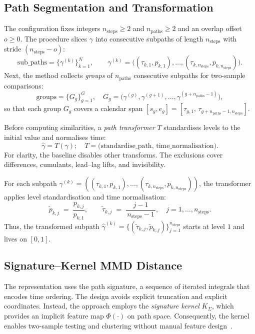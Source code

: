 \subsection{Path Segmentation and Transformation}\label{sec:regime:seg}
The configuration fixes integers $n_{\text{steps}}\ge 2$ and $n_{\text{paths}}\ge 2$ and an overlap offset $o\ge 0$. The procedure slices $\gamma$ into consecutive subpaths of length $n_{\text{steps}}$ with stride $(n_{\text{steps}}-o)$:
\[
\textstyle
\mathrm{sub\_paths}
=\big\{\gamma^{(k)}\big\}_{k=1}^{N},\qquad
\gamma^{(k)}=\big((\tau_{k,1},p_{k,1}),\ldots,(\tau_{k,n_{\text{steps}}},p_{k,n_{\text{steps}}})\big).
\]
Next, the method collects \emph{groups} of $n_{\text{paths}}$ consecutive subpaths for two-sample comparisons:
\[
\textstyle
\mathrm{groups}=\big\{G_g\big\}_{g=1}^{G},\quad
G_g=\big(\gamma^{(g)},\gamma^{(g+1)},\ldots,\gamma^{(g+n_{\text{paths}}-1)}\big),
\]
so that each group $G_g$ covers a calendar span
$[s_g,e_g]=[\tau_{g,1},\,\tau_{g+n_{\text{paths}}-1,n_{\text{steps}}}]$.

Before computing similarities, a \emph{path transformer} \(T\) standardises levels to the initial value and normalises time:
\[
\widehat\gamma=T(\gamma);\quad
T=\text{(standardise\_path, time\_normalisation)}.
\]
For clarity, the baseline disables other transforms. The exclusions cover differences, cumulants, lead--lag lifts, and invisibility.

For each subpath $\gamma^{(k)}=((\tau_{k,1},p_{k,1}),\dots,(\tau_{k,n_{\text{steps}}},p_{k,n_{\text{steps}}}))$, the transformer applies level standardisation and time normalisation:
\[
\tilde p_{k,j}\;=\;\frac{p_{k,j}}{p_{k,1}},\qquad
\tilde \tau_{k,j}\;=\;\frac{j-1}{\,n_{\text{steps}}-1\,},\quad j=1,\dots, n_{\text{steps}}.
\]
Thus, the transformed subpath $\widehat\gamma^{(k)}=\{(\tilde\tau_{k,j},\tilde p_{k,j})\}_{j=1}^{n_{\text{steps}}}$ starts at level $1$ and lives on $[0,1]$.

\subsection{Signature--Kernel MMD Distance}\label{sec:regime:mmd}
The representation uses the path signature, a sequence of iterated integrals that encodes time ordering. The design avoids explicit truncation and explicit coordinates. Instead, the approach employs the \emph{signature kernel} $K_\Sigma$, which provides an implicit feature map $\Phi(\cdot)$ on path space. Consequently, the kernel enables two-sample testing and clustering without manual feature design~\cite{chevyrev2025primersignaturemethodmachine}.

